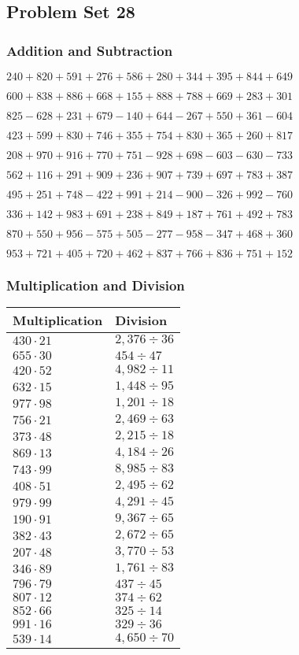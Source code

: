 \hypertarget{problem-set-28-2}{%
\subsection{Problem Set 28}\label{problem-set-28-2}}

\hypertarget{addition-and-subtraction-128}{%
\subsubsection{Addition and
Subtraction}\label{addition-and-subtraction-128}}

\(240 + 820 + 591 + 276 + 586 + 280 + 344 + 395 + 844 + 649\)

\(600 + 838 + 886 + 668 + 155 + 888 + 788 + 669 + 283 + 301\)

\(825 - 628 + 231 + 679 - 140 + 644 - 267 + 550 + 361 - 604\)

\(423 + 599 + 830 + 746 + 355 + 754 + 830 + 365 + 260 + 817\)

\(208 + 970 + 916 + 770 + 751 - 928 + 698 - 603 - 630 - 733\)

\(562 + 116 + 291 + 909 + 236 + 907 + 739 + 697 + 783 + 387\)

\(495 + 251 + 748 - 422 + 991 + 214 - 900 - 326 + 992 - 760\)

\(336 + 142 + 983 + 691 + 238 + 849 + 187 + 761 + 492 + 783\)

\(870 + 550 + 956 - 575 + 505 - 277 - 958 - 347 + 468 + 360\)

\(953 + 721 + 405 + 720 + 462 + 837 + 766 + 836 + 751 + 152\)

\hypertarget{multiplication-and-division-128}{%
\subsubsection{Multiplication and
Division}\label{multiplication-and-division-128}}

\begin{longtable}[]{@{}ll@{}}
\toprule
Multiplication & Division\tabularnewline
\midrule
\endhead
\(430 \cdot 21\) & \(2,376 ÷36\)\tabularnewline
\(655 \cdot 30\) & \(454 ÷ 47\)\tabularnewline
\(420 \cdot 52\) & \(4,982÷11\)\tabularnewline
\(632 \cdot 15\) & \(1,448÷95\)\tabularnewline
\(977 \cdot 98\) & \(1,201÷18\)\tabularnewline
\(756 \cdot 21\) & \(2,469÷63\)\tabularnewline
\(373 \cdot 48\) & \(2,215÷18\)\tabularnewline
\(869 \cdot 13\) & \(4,184÷26\)\tabularnewline
\(743 \cdot 99\) & \(8,985÷83\)\tabularnewline
\(408 \cdot 51\) & \(2,495÷62\)\tabularnewline
\(979 \cdot 99\) & \(4,291÷45\)\tabularnewline
\(190 \cdot 91\) & \(9,367÷65\)\tabularnewline
\(382 \cdot 43\) & \(2,672÷65\)\tabularnewline
\(207 \cdot 48\) & \(3,770÷53\)\tabularnewline
\(346 \cdot 89\) & \(1,761÷83\)\tabularnewline
\(796 \cdot 79\) & \(437÷45\)\tabularnewline
\(807 \cdot 12\) & \(374÷62\)\tabularnewline
\(852 \cdot 66\) & \(325÷14\)\tabularnewline
\(991 \cdot 16\) & \(329÷36\)\tabularnewline
\(539 \cdot 14\) & \(4,650÷70\)\tabularnewline
\bottomrule
\end{longtable}


